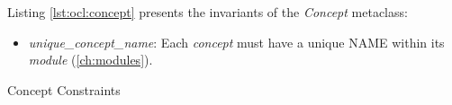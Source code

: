 Listing \ref{lst:ocl:concept} presents the invariants of the \emph{Concept} metaclass:

\begin{itemize}

\item \emph{unique\_concept\_name}:
Each \emph{concept} must have a unique NAME within its \emph{module} (\ref{ch:modules}).

\end{itemize}

\begin{code}

\caption{Concept Constraints}
\label{lst:ocl:concept}
\end{code}
